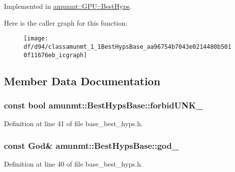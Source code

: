 Implemented in \hyperlink{classamunmt_1_1GPU_1_1BestHyps_aada8fcf38e61fd1ce649432cb45376d9}{amunmt\+::\+G\+P\+U\+::\+Best\+Hyps}.



Here is the caller graph for this function\+:
\nopagebreak
\begin{figure}[H]
\begin{center}
\leavevmode
\texttt{[image: df/d94/classamunmt\_1\_1BestHypsBase\_aa96754b7043e0214480b5010f11676eb\_icgraph]}
\end{center}
\end{figure}




\subsection{Member Data Documentation}
\subsubsection[{\texorpdfstring{forbid\+U\+N\+K\+\_\+}{forbidUNK_}}]{\setlength{\rightskip}{0pt plus 5cm}const bool amunmt\+::\+Best\+Hyps\+Base\+::forbid\+U\+N\+K\+\_\+\hspace{0.3cm}{\ttfamily [protected]}}\hypertarget{classamunmt_1_1BestHypsBase_a9592ecfcb2ccd15751b8694525412648}{}\label{classamunmt_1_1BestHypsBase_a9592ecfcb2ccd15751b8694525412648}


Definition at line 41 of file base\+\_\+best\+\_\+hyps.\+h.

\subsubsection[{\texorpdfstring{god\+\_\+}{god_}}]{\setlength{\rightskip}{0pt plus 5cm}const {\bf God}\& amunmt\+::\+Best\+Hyps\+Base\+::god\+\_\+\hspace{0.3cm}{\ttfamily [protected]}}\hypertarget{classamunmt_1_1BestHypsBase_ab61b0c276c75cdb08dfb054893084ccd}{}\label{classamunmt_1_1BestHypsBase_ab61b0c276c75cdb08dfb054893084ccd}


Definition at line 40 of file base\+\_\+best\+\_\+hyps.\+h.

